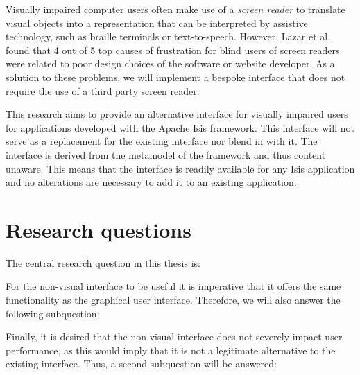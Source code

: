 Visually impaired computer users often make use of a \textit{screen reader} to translate visual objects into a representation that can be interpreted by assistive technology, such as braille terminals or text-to-speech. However, Lazar et al. found that 4 out of 5 top causes of frustration for blind users of screen readers were related to poor design choices of the software or website developer\cite{lazar2007frustrates}. As a solution to these problems, we will implement a bespoke interface that does not require the use of a third party screen reader.

This research aims to provide an alternative interface for visually impaired users for applications developed with the Apache Isis\cite{Apach60:online} framework. This interface will not serve as a replacement for the existing interface nor blend in with it. The interface is derived from the metamodel of the framework and thus content unaware. This means that the interface is readily available for any Isis application and no alterations are necessary to add it to an existing application.

\section{Research questions}
\label{section:researchquestions}
The central research question in this thesis is:

 \label{RQ1}

\noindent For the non-visual interface to be useful it is imperative that it offers the same functionality as the graphical user interface. Therefore, we will also answer the following subquestion:

 \label{RQ2}

\noindent Finally, it is desired that the non-visual interface does not severely impact user performance, as this would imply that it is not a legitimate alternative to the existing interface. Thus, a second subquestion will be answered:

 \label{RQ3}

